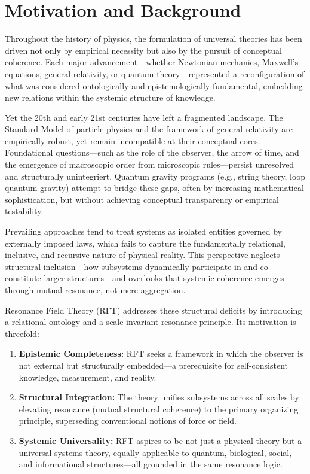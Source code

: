 \documentclass[12pt]{iopart}
\begin{document}
\section{Motivation and Background}

Throughout the history of physics, the formulation of universal theories has been driven not only by empirical necessity but also by the pursuit of conceptual coherence. Each major advancement—whether Newtonian mechanics, Maxwell's equations, general relativity, or quantum theory—represented a reconfiguration of what was considered ontologically and epistemologically fundamental, embedding new relations within the systemic structure of knowledge.

Yet the 20th and early 21st centuries have left a fragmented landscape. The Standard Model of particle physics and the framework of general relativity are empirically robust, yet remain incompatible at their conceptual cores. Foundational questions—such as the role of the observer, the arrow of time, and the emergence of macroscopic order from microscopic rules—persist unresolved and structurally unintegriert. Quantum gravity programs (e.g., string theory, loop quantum gravity) attempt to bridge these gaps, often by increasing mathematical sophistication, but without achieving conceptual transparency or empirical testability.

Prevailing approaches tend to treat systems as isolated entities governed by externally imposed laws, which fails to capture the fundamentally relational, inclusive, and recursive nature of physical reality. This perspective neglects structural inclusion—how subsystems dynamically participate in and co-constitute larger structures—and overlooks that systemic coherence emerges through mutual resonance, not mere aggregation.

Resonance Field Theory (RFT) addresses these structural deficits by introducing a relational ontology and a scale-invariant resonance principle. Its motivation is threefold:

\begin{enumerate}
	\item \textbf{Epistemic Completeness:} RFT seeks a framework in which the observer is not external but structurally embedded—a prerequisite for self-consistent knowledge, measurement, and reality.
	\item \textbf{Structural Integration:} The theory unifies subsystems across all scales by elevating resonance (mutual structural coherence) to the primary organizing principle, superseding conventional notions of force or field.
	\item \textbf{Systemic Universality:} RFT aspires to be not just a physical theory but a universal systems theory, equally applicable to quantum, biological, social, and informational structures—all grounded in the same resonance logic.
\end{enumerate}
\end{document}
